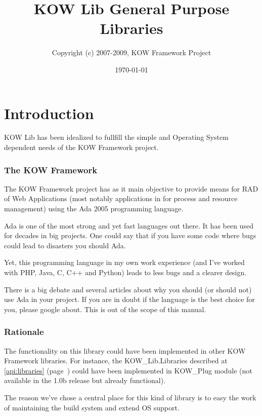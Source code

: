 \documentclass[english,letterpaper]{book}
\newcommand\Ref[1]{\textsection\ref{#1} (page~\pageref{#1})}
\begin{document}
\title{KOW Lib General Purpose Libraries}
\author{%
Copyright (c) 2007-2009, KOW Framework Project
}
\date{\today}
\maketitle

\tableofcontents{}
\listoftables

\chapter{Introduction}
KOW Lib has been idealized to fullfill the simple and Operating System dependent needs
of the KOW Framework project.



\subsection{The KOW Framework}
The KOW Framework project has as it main objective to provide means for RAD of Web
Applications (most notably applications in for process and resource management)
using the Ada 2005 programming language.

Ada is one of the most strong and yet fast languages out there. It has been used
for decades in big projects. One could say that if you have some code where bugs
could lead to disasters you should Ada.

Yet, this programming language in my own work experience (and I've worked with PHP,
Java, C, C++ and Python) leads to less bugs and a clearer design.

There is a big debate and several articles about why you should (or should not) use
Ada in your project. If you are in doubt if the language is the best choice for you,
please google about. This is out of the scope of this manual.


\subsection{Rationale}
The functionality on this library could have been implemented in other KOW Framework
libraries. For instance, the KOW\_Lib.Libraries described at \Ref{api:libraries} could have been
implemented in KOW\_Plug module (not available in the 1.0b release but already functional).

The reason we've chose a central place for this kind of library is to easy the work
of maintaining the build system and extend OS support.
\end{document}
